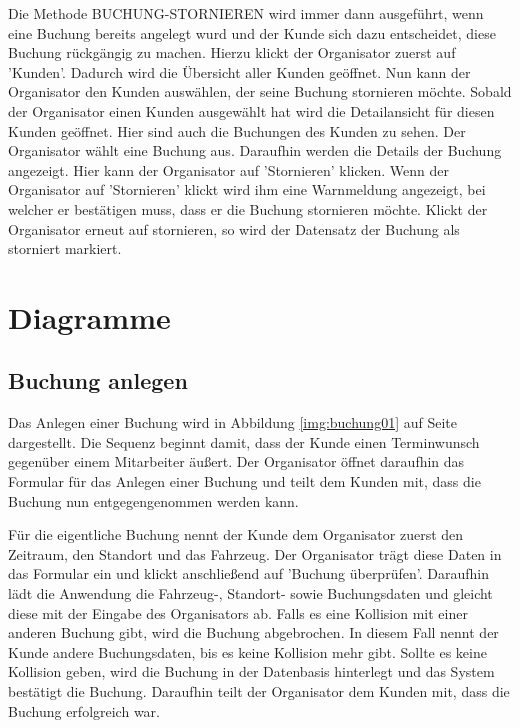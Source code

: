 
Die Methode BUCHUNG-STORNIEREN wird immer dann ausgeführt, wenn eine Buchung bereits angelegt wurd und der Kunde sich dazu entscheidet, diese Buchung rückgängig zu machen. Hierzu klickt der Organisator zuerst auf 'Kunden'. Dadurch wird die Übersicht aller Kunden geöffnet. Nun kann der Organisator den Kunden auswählen, der seine Buchung stornieren möchte. Sobald der Organisator einen Kunden ausgewählt hat wird die Detailansicht für diesen Kunden geöffnet. Hier sind auch die Buchungen des Kunden zu sehen. Der Organisator wählt eine Buchung aus. Daraufhin werden die Details der Buchung angezeigt. Hier kann der Organisator auf 'Stornieren' klicken. Wenn der Organisator auf 'Stornieren' klickt wird ihm eine Warnmeldung angezeigt, bei welcher er bestätigen muss, dass er die Buchung stornieren möchte. Klickt der Organisator erneut auf stornieren, so wird der Datensatz der Buchung als storniert markiert.


\newpage

\section{Diagramme}

\subsection{Buchung anlegen}


Das Anlegen einer Buchung wird in Abbildung \ref{img:buchung01} auf Seite \pageref{img:buchung01} dargestellt. Die Sequenz beginnt damit, dass der Kunde einen Terminwunsch gegenüber einem Mitarbeiter äußert. Der Organisator öffnet daraufhin das Formular für das Anlegen einer Buchung und teilt dem Kunden mit, dass die Buchung nun entgegengenommen werden kann.

Für die eigentliche Buchung nennt der Kunde dem Organisator zuerst den Zeitraum, den Standort und das Fahrzeug. Der Organisator trägt diese Daten in das Formular ein und klickt anschließend auf 'Buchung überprüfen'. Daraufhin lädt die Anwendung die Fahrzeug-, Standort- sowie Buchungsdaten und gleicht diese mit der Eingabe des Organisators ab. Falls es eine Kollision mit einer anderen Buchung gibt, wird die Buchung abgebrochen. In diesem Fall nennt der Kunde andere Buchungsdaten, bis es keine Kollision mehr gibt. Sollte es keine Kollision geben, wird die Buchung in der Datenbasis hinterlegt und das System bestätigt die Buchung. Daraufhin teilt der Organisator dem Kunden mit, dass die Buchung erfolgreich war.


